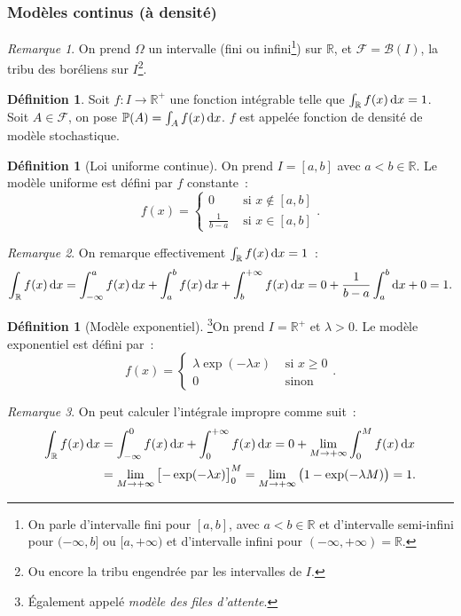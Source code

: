 \documentclass{article}
\renewcommand{\P}{\mathbb P}
\newcommand{\R}{\mathbb R}
\theoremstyle{definition}
\newtheorem{déf}[thm]{Définition}
\theoremstyle{remark}
\newtheorem*{rmq}{Remarque}
\begin{document}
		\subsubsection{Modèles continus (à densité)}
		\begin{rmq} On prend $\Omega$ un intervalle (fini ou infini\footnote{On parle d'intervalle fini pour $[a, b]$, avec $a < b \in \R$ et d'intervalle
		semi-infini pour $(-\infty, b]$ ou $[a, +\infty)$ et d'intervalle infini pour $(-\infty, +\infty) = \R$.}) sur $\R$, et $\mathcal F = \mathcal B(I)$,
		la tribu des boréliens sur $I$\footnote{Ou encore la tribu engendrée par les intervalles de $I$.}. \end{rmq}

		\begin{déf} Soit $f : I \to \R^+$ une fonction intégrable telle que $\int_\R f(x)\dif x = 1$. Soit $A \in \mathcal F$, on pose
		$\P(A) = \int_Af(x)\dif x$. $f$ est appelée fonction de densité de modèle stochastique. \end{déf}

		\begin{déf}[Loi uniforme continue] On prend $I = [a, b]$ avec $a < b \in \R$. Le modèle uniforme est défini par $f$ constante~:
		\[f(x) = \begin{cases}0 &\text{ si }x \not \in [a, b] \\\frac 1{b-a} &\text{ si }x \in [a, b]\end{cases}.\] \end{déf}

		\begin{rmq} On remarque effectivement $\int_\R f(x)\dif x = 1$~:
		\[\int_\R f(x)\dif x = \int_{-\infty}^a f(x)\dif x + \int_a^b f(x)\dif x + \int_b^{+\infty} f(x)\dif x = 0 + \frac 1{b-a}\int_a^b\dif x + 0 = 1.\]
		\end{rmq}

		\begin{déf}[Modèle exponentiel]\footnote{Également appelé \emph{modèle des files d'attente}.}\label{modèleExponentiel} On prend $I = \R^+$ et
		$\lambda > 0$. Le modèle exponentiel est défini par~:
		\[f(x) = \begin{cases}\lambda\exp(-\lambda x) &\text{ si }x \geq 0 \\ 0 &\text{ sinon}\end{cases}.\]
		\end{déf}

		\begin{rmq} On peut calculer l'intégrale impropre comme suit~:
		\[\begin{aligned}
			\int_\R f(x)\dif x &= \int_{-\infty}^0f(x)\dif x + \int_0^{+\infty}f(x)\dif x = 0 + \lim_{M \to +\infty}\int_0^Mf(x)\dif x \\
			&= \lim_{M \to +\infty}\left[-\exp(-\lambda x)\right]_0^M = \lim_{M \to +\infty}\left(1 - \exp(-\lambda M)\right) = 1.
		\end{aligned}\]
		\end{rmq}
\end{document}
